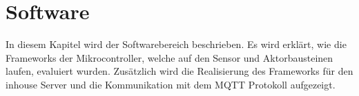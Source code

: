 \section{Software}
In diesem Kapitel wird der Softwarebereich beschrieben. Es wird erklärt, wie die Frameworks der Mikrocontroller, welche auf den Sensor und Aktorbausteinen laufen, evaluiert wurden. Zusätzlich wird die Realisierung des Frameworks für den inhouse Server und die Kommunikation mit dem MQTT Protokoll aufgezeigt.








